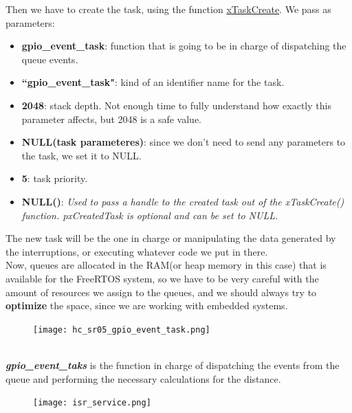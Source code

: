 \documentclass[14pt]{article}
\begin{document}
\begin{normalsize}
		Then we have to create the task, using the function \href{https://www.freertos.org/Documentation/02-Kernel/04-API-references/01-Task-creation/01-xTaskCreate}{xTaskCreate}. We pass as parameters:
		\begin{itemize}
			\item \textbf{gpio\_event\_task}: function that is going to be in charge of dispatching the queue events.
			\item \textbf{``gpio\_event\_task"}: kind of an identifier name for the task.
			\item \textbf{2048}: stack depth. Not enough time to fully understand how exactly this parameter affects, but 2048 is a safe value.
			\item \textbf{NULL(task parameteres)}: since we don't need to send any parameters to the task, we set it to NULL.
			\item \textbf{5}: task priority.
			\item \textbf{NULL()}: \textit{Used to pass a handle to the created task out of the xTaskCreate() function. pxCreatedTask is optional and can be set to NULL.}
		\end{itemize}
		The new task will be the one in charge or manipulating the data generated by the interruptions, or executing whatever code we put in there.\\
		
		\noindent Now, queues are allocated in the RAM(or heap memory in this case) that is available for the FreeRTOS system, so we have to be very careful with the amount of resources we assign to the queues, and we should always try to \textbf{optimize} the space, since we are working with embedded systems.\\
		\setlength{\intextsep}{0pt}
		\begin{figure}[h]
			\centering
			\texttt{[image: hc\_sr05\_gpio\_event\_task.png]}
		\end{figure}\vspace{5pt}\\
		\textbf{\textit{gpio\_event\_taks}} is the function in charge of dispatching the events from the queue and performing the necessary calculations for the distance. \\
		
		\vspace{10pt}
		\setlength{\intextsep}{0pt}
		\begin{figure}
			\texttt{[image: isr\_service.png]}
		\end{figure}
		

\end{normalsize}
\end{document}

